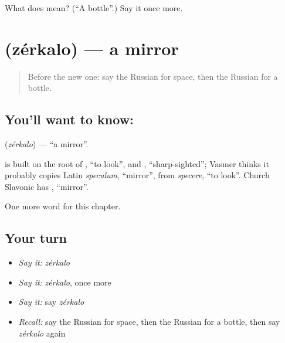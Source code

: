 \begin{tcolorbox}[breakable,colback=teal!4,colframe=teal!35!black,title={Before you move on}]
What does  mean? (\textquotedblleft{}A bottle\textquotedblright{}.) Say it once more.
\end{tcolorbox}
\section[\texorpdfstring{\ru{зеркало} (zérkalo)}{зеркало (zérkalo)}]{ (zérkalo) — a mirror}

\label{lesson:RU-C123-mirror}



\begin{quote}
Before the new one: say the Russian for space, then the Russian for a bottle.
\end{quote}

\subsection*{You'll want to know: }
\textbf{} (\emph{zérkalo}) — \textquotedblleft{}a mirror\textquotedblright{}.

\begin{cousinweb}
\textbf{} is built on the root of \emph{}, \textquotedblleft{}to look\textquotedblright{}, and \emph{}, \textquotedblleft{}sharp-sighted\textquotedblright{}; Vasmer thinks it probably copies Latin \emph{speculum}, \textquotedblleft{}mirror\textquotedblright{}, from \emph{specere}, \textquotedblleft{}to look\textquotedblright{}. Church Slavonic has \emph{}, \textquotedblleft{}mirror\textquotedblright{}.
\end{cousinweb}

\begin{grammarlens}[title={What you've built}]
One more word for this chapter.
\end{grammarlens}

\subsection*{Your turn}
\begin{itemize}
\raggedright
  \item \emph{Say it:} \emph{zérkalo}
  \item \emph{Say it:} \emph{zérkalo}, once more
  \item \emph{Say it:} say \emph{zérkalo}
  \item \emph{Recall:} say the Russian for space, then the Russian for a bottle, then say \emph{zérkalo} again
\end{itemize}

